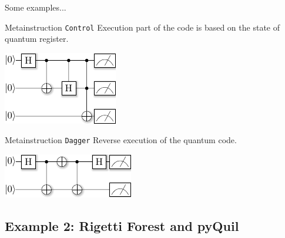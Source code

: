 \documentclass{beamer}
\begin{document}
\begin{frame}{\insertsection}{\insertsubsection}
Some examples...
\end{frame}

\begin{frame}{\insertsection}{\insertsubsection}
    \begin{block}{Metainstruction \texttt{Control}}
        Execution part of the code is based on the state of quantum register.
    \end{block}

    \begin{center}
     \includegraphics[scale=1.5]{pics/meta_control_circ.pdf}
    \end{center}
\end{frame}

\begin{frame}{\insertsection}{\insertsubsection}
    \begin{block}{Metainstruction \texttt{Dagger}}
        Reverse execution of the quantum code.
    \end{block}
    
    \begin{center}
        \includegraphics[scale=1.5]{pics/meta_dagger_circ.pdf}
    \end{center}
\end{frame}

\subsection{Example 2: Rigetti Forest and pyQuil}
\end{document}
